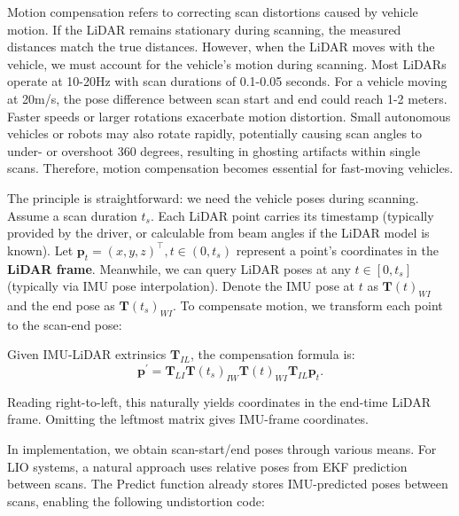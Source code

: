 Motion compensation refers to correcting scan distortions caused by vehicle motion. If the LiDAR remains stationary during scanning, the measured distances match the true distances. However, when the LiDAR moves with the vehicle, we must account for the vehicle's motion during scanning. Most LiDARs operate at 10-20Hz with scan durations of 0.1-0.05 seconds. For a vehicle moving at 20m/s, the pose difference between scan start and end could reach 1-2 meters. Faster speeds or larger rotations exacerbate motion distortion. Small autonomous vehicles or robots may also rotate rapidly, potentially causing scan angles to under- or overshoot 360 degrees, resulting in ghosting artifacts within single scans. Therefore, motion compensation becomes essential for fast-moving vehicles.

The principle is straightforward: we need the vehicle poses during scanning. Assume a scan duration $t_s$. Each LiDAR point carries its timestamp (typically provided by the driver, or calculable from beam angles if the LiDAR model is known). Let $\bm{p}_t = (x,y,z)^\top, t \in (0,t_s)$ represent a point's coordinates in the \textbf{LiDAR frame}. Meanwhile, we can query LiDAR poses at any $t \in [0,t_s]$ (typically via IMU pose interpolation). Denote the IMU pose at $t$ as $\bm{T}(t)_{WI}$ and the end pose as $\bm{T}(t_s)_{WI}$. To compensate motion, we transform each point to the scan-end pose:

Given IMU-LiDAR extrinsics $\bm{T}_{IL}$, the compensation formula is:
\begin{equation}\label{key}
	\bm{p}^\prime = \bm{T}_{LI} \bm{T}(t_s)_{IW} \bm{T}(t)_{WI} \bm{T}_{IL} \bm{p}_t.
\end{equation}

Reading right-to-left, this naturally yields coordinates in the end-time LiDAR frame. Omitting the leftmost matrix gives IMU-frame coordinates.

In implementation, we obtain scan-start/end poses through various means. For LIO systems, a natural approach uses relative poses from EKF prediction between scans. The Predict function already stores IMU-predicted poses between scans, enabling the following undistortion code:

